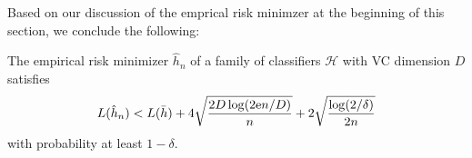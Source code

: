 Based on our discussion of the emprical risk minimzer at the beginning of this section, we conclude the following:

\begin{corollary}
The empirical risk minimizer $\hat h_n$ of a family of classifiers $\mathcal{H}$ with VC dimension $D$ satisfies
\[
    L(\hat h_n) < L(\bar h) + 4 \sqrt{\frac{2D \log(2 \mathrm{e} n / D)}{n}} + 2 \sqrt{\frac{\log(2 / \delta)}{2n}}
\]
with probability at least $1 - \delta$.
\end{corollary}
